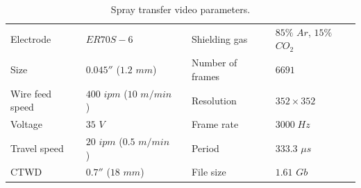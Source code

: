 \begin{table}
\centering
\caption[Spray transfer video parameters]{Spray transfer video parameters.}
\label{table:spray_params}
\begin{tabular}{|l|l|lll}
\cline{1-2} \cline{4-5}
Electrode       & $ER70S-6$             & \multicolumn{1}{l|}{} & \multicolumn{1}{l|}{Shielding gas}     & \multicolumn{1}{l|}{$85\%$ $Ar$, $15\%$ $CO_2$} \\ \cline{1-2} \cline{4-5} 
Size            & $0.045''$ ($1.2$ $mm$)     & \multicolumn{1}{l|}{} & \multicolumn{1}{l|}{Number of frames}  & \multicolumn{1}{l|}{$6691$}              \\ \cline{1-2} \cline{4-5} 
Wire feed speed & $400$ $ipm$ ($10$ $m/min$) & \multicolumn{1}{l|}{} & \multicolumn{1}{l|}{Resolution}        & \multicolumn{1}{l|}{$352 \times 352$}           \\ \cline{1-2} \cline{4-5} 
Voltage         & $35$ $V$                 & \multicolumn{1}{l|}{} & \multicolumn{1}{l|}{Frame rate} & \multicolumn{1}{l|}{$3000\;Hz$}              \\ \cline{1-2} \cline{4-5} 
Travel speed    & $20$ $ipm$ ($0.5$ $m/min$)  & \multicolumn{1}{l|}{} & \multicolumn{1}{l|}{Period}            & \multicolumn{1}{l|}{$333.3$ $\mu s$}           \\ \cline{1-2} \cline{4-5} 
CTWD & $0.7''$ ($18$ $mm$) &\multicolumn{1}{l|}{} & \multicolumn{1}{l|}{File size}            & \multicolumn{1}{l|}{$1.61$ $Gb$}  \\ \cline{1-2}\cline{4-5} 
\end{tabular}
\end{table}




